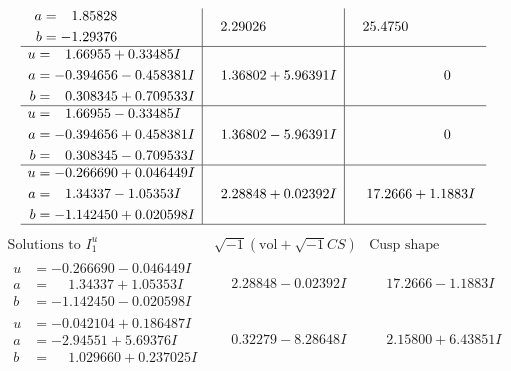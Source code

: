 \documentclass[1p]{elsarticle_modified}
\theoremstyle{definition}
\newcommand{\I}{\sqrt{-1}}
\begin{document}
$$\begin{array}{c|c|c}
\begin{aligned}
a &= \phantom{-}1.85828\phantom{ +0.000000I} \\
b &= -1.29376\phantom{ +0.000000I}\end{aligned}
 & \phantom{-}2.29026\phantom{ +0.000000I} & \phantom{-}25.4750\phantom{ +0.000000I} \\ \hline\begin{aligned}
u &= \phantom{-}1.66955 + 0.33485 I \\
a &= -0.394656 - 0.458381 I \\
b &= \phantom{-}0.308345 + 0.709533 I\end{aligned}
 & \phantom{-}1.36802 + 5.96391 I & \phantom{-0.000000 } 0 \\ \hline\begin{aligned}
u &= \phantom{-}1.66955 - 0.33485 I \\
a &= -0.394656 + 0.458381 I \\
b &= \phantom{-}0.308345 - 0.709533 I\end{aligned}
 & \phantom{-}1.36802 - 5.96391 I & \phantom{-0.000000 } 0 \\ \hline\begin{aligned}
u &= -0.266690 + 0.046449 I \\
a &= \phantom{-}1.34337 - 1.05353 I \\
b &= -1.142450 + 0.020598 I\end{aligned}
 & \phantom{-}2.28848 + 0.02392 I & \phantom{-}17.2666 + 1.1883 I\\
 \hline 
 \end{array}$$\newpage$$\begin{array}{c|c|c}  
\text{Solutions to }I^u_{1}& \I (\text{vol} + \sqrt{-1}CS) & \text{Cusp shape}\\
 \hline 
\begin{aligned}
u &= -0.266690 - 0.046449 I \\
a &= \phantom{-}1.34337 + 1.05353 I \\
b &= -1.142450 - 0.020598 I\end{aligned}
 & \phantom{-}2.28848 - 0.02392 I & \phantom{-}17.2666 - 1.1883 I \\ \hline\begin{aligned}
u &= -0.042104 + 0.186487 I \\
a &= -2.94551 + 5.69376 I \\
b &= \phantom{-}1.029660 + 0.237025 I\end{aligned}
 & \phantom{-}0.32279 - 8.28648 I & \phantom{-}2.15800 + 6.43851 I \\ \hline\begin{aligned}

\end{aligned}
\end{array}$$
\end{document}
